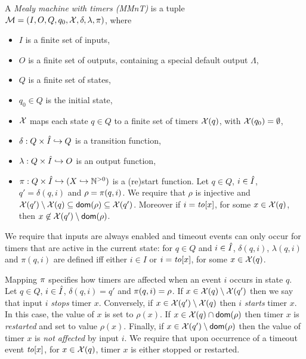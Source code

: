 \begin{definition}
\label{def:MMnT}
A \emph{Mealy machine with timers (MMnT)} is a tuple
\\
${\cal M} = (I, O, Q, q_0, \mathcal{X}, \delta, \lambda, \pi)$, where
\begin{itemize}
\item
$I$ is a finite set of inputs,
\item
$O$ is a finite set of outputs, containing a special default output $\Lambda$,
\item
$Q$ is a finite set of states,
\item
$q_0 \in Q$ is the initial state,
\item
$\mathcal{X}$ maps each state $q \in Q$ to a finite set of timers $\mathcal{X}(q)$, with $\mathcal{X}(q_0) = \emptyset$,
\item
$\delta: Q \times \hat{I} \hookrightarrow  Q$ is a transition function,
\item
$\lambda: Q \times \hat{I} \hookrightarrow O$ is an output function, 
\item
$\pi : Q \times \hat{I} \hookrightarrow (X \hookrightarrow {\mathbb N}^{>0})$ is a (re)start function.
Let $q \in Q$, $i \in \hat{I}$, $q'=\delta(q,i)$ and $\rho=\pi(q,i)$. 
We require that $\rho$ is injective and $\mathcal{X}(q') \setminus \mathcal{X}(q) \subseteq {\textsf{dom}}(\rho) \subseteq\mathcal{X}(q')$. Moreover
  if $i=\mathit{to}[x]$, for some $x \in\mathcal{X}(q)$, then $x \not\in \mathcal{X}(q') \setminus {\textsf{dom}}(\rho)$.
\end{itemize}
We require that inputs are always enabled and timeout events can only occur for timers that are active in the current state:
for $q \in Q$ and $i \in \hat{I}$,  $\delta(q,i)$, $\lambda(q,i)$ and $\pi(q,i)$ are defined iff either
$i \in I$ or $i=\mathit{to}[x]$, for some $x \in\mathcal{X}(q)$.
\end{definition}
Mapping $\pi$ specifies how timers are affected when an event $i$ occurs in state $q$.
Let $q \in Q$, $i \in \hat{I}$, $\delta(q,i)=q'$ and $\pi(q,i)=\rho$.
If $x \in\mathcal{X}(q) \setminus \mathcal{X}(q')$ then we say that input $i$ \emph{stops} timer $x$.
Conversely, if $x \in \mathcal{X}(q') \setminus \mathcal{X}(q)$ then $i$ \emph{starts} timer $x$.
In this case, the value of $x$ is set to $\rho(x)$.
If $x \in \mathcal{X}(q) \cap {\textsf{dom}}(\rho)$ then timer $x$ is \emph{restarted} and set to value $\rho(x)$.
Finally, if $x \in \mathcal{X}(q') \setminus {\textsf{dom}}(\rho)$ then the value of timer $x$ is \emph{not affected} by input $i$.
We require that upon occurrence of a timeout event $\mathit{to}[x]$, for $x \in \mathcal{X}(q)$, timer $x$ is either stopped or restarted.

